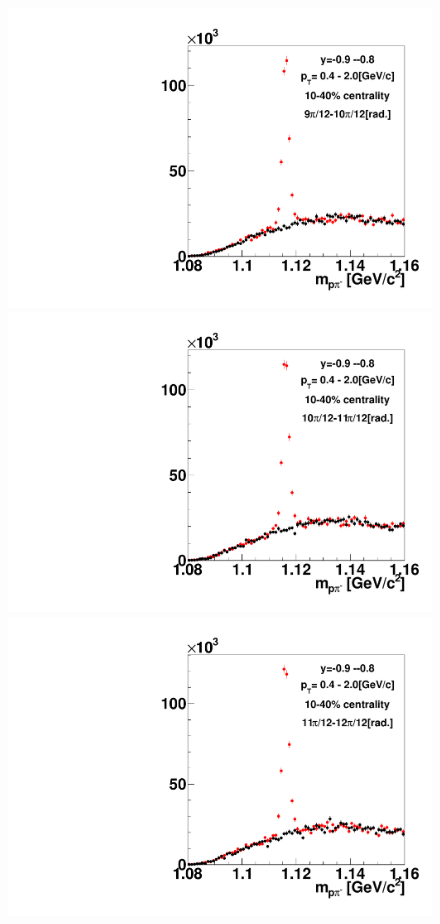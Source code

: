 \begin{figure}[h]
\includegraphics[width=0.14\linewidth]{chapterX/fig/ld_v1_sig/kf_ptslice0_cent1_ld_flow_phi10_rap13_check.pdf}
\includegraphics[width=0.14\linewidth]{chapterX/fig/ld_v1_sig/kf_ptslice0_cent1_ld_flow_phi11_rap13_check.pdf}
\includegraphics[width=0.14\linewidth]{chapterX/fig/ld_v1_sig/kf_ptslice0_cent1_ld_flow_phi12_rap13_check.pdf}


\end{figure}

